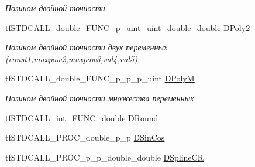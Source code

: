 \begin{DoxyCompactItemize}
\begin{DoxyCompactList}\small\item\em Полином двойной точности \end{DoxyCompactList}\item 
\hypertarget{structs_functions_math_c_p_u_a6500890de2dfd5e56b2180a4cccf08f8}{tf\-S\-T\-D\-C\-A\-L\-L\-\_\-double\-\_\-\-F\-U\-N\-C\-\_\-p\-\_\-uint\-\_\-uint\-\_\-double\-\_\-double \hyperlink{structs_functions_math_c_p_u_a6500890de2dfd5e56b2180a4cccf08f8}{D\-Poly2}}\label{structs_functions_math_c_p_u_a6500890de2dfd5e56b2180a4cccf08f8}

\begin{DoxyCompactList}\small\item\em Полином двойной точности двух переменных (const1,maxpow2,maxpow3,val4,val5) \end{DoxyCompactList}\item 
\hypertarget{structs_functions_math_c_p_u_a856cb0f99c10f491359f10d5de4ec22e}{tf\-S\-T\-D\-C\-A\-L\-L\-\_\-double\-\_\-\-F\-U\-N\-C\-\_\-p\-\_\-p\-\_\-p\-\_\-uint \hyperlink{structs_functions_math_c_p_u_a856cb0f99c10f491359f10d5de4ec22e}{D\-Poly\-M}}\label{structs_functions_math_c_p_u_a856cb0f99c10f491359f10d5de4ec22e}

\begin{DoxyCompactList}\small\item\em Полином двойной точности множества переменных \end{DoxyCompactList}\item 
tf\-S\-T\-D\-C\-A\-L\-L\-\_\-int\-\_\-\-F\-U\-N\-C\-\_\-double \hyperlink{structs_functions_math_c_p_u_ab121db5d6b3c9cc0e9216695a3db750e}{D\-Round}
\item 
tf\-S\-T\-D\-C\-A\-L\-L\-\_\-\-P\-R\-O\-C\-\_\-double\-\_\-p\-\_\-p \hyperlink{structs_functions_math_c_p_u_af0041148eda2de2c208f69faa3537b37}{D\-Sin\-Cos}
\item 
\hypertarget{structs_functions_math_c_p_u_a9ef25e7c1141d2d08fc2d6e8808200e1}{tf\-S\-T\-D\-C\-A\-L\-L\-\_\-\-P\-R\-O\-C\-\_\-p\-\_\-p\-\_\-double\-\_\-double \hyperlink{structs_functions_math_c_p_u_a9ef25e7c1141d2d08fc2d6e8808200e1}{D\-Spline\-C\-R}}\label{structs_functions_math_c_p_u_a9ef25e7c1141d2d08fc2d6e8808200e1}


\end{DoxyCompactItemize}
